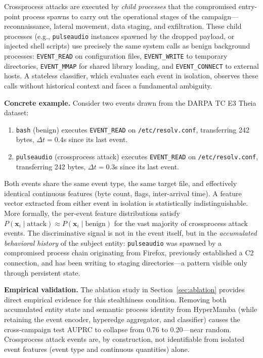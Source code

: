 \documentclass[letterpaper,twocolumn,10pt]{article}
\begin{document}
Crossprocess attacks are executed by \emph{child processes} that the compromised entry-point process spawns to carry out the operational stages of the campaign---reconnaissance, lateral movement, data staging, and exfiltration. These child processes (e.g., \texttt{pulseaudio} instances spawned by the dropped payload, or injected shell scripts) use precisely the same system calls as benign background processes: \texttt{EVENT\_READ} on configuration files, \texttt{EVENT\_WRITE} to temporary directories, \texttt{EVENT\_MMAP} for shared library loading, and \texttt{EVENT\_CONNECT} to external hosts. A stateless classifier, which evaluates each event in isolation, observes these calls without historical context and faces a fundamental ambiguity.

\textbf{Concrete example.} Consider two events drawn from the DARPA TC E3 Theia dataset:
\begin{enumerate}
    \item \texttt{bash} (benign) executes \texttt{EVENT\_READ} on \texttt{/etc/resolv.conf}, transferring 242 bytes, $\Delta t = 0.4$s since its last event.
    \item \texttt{pulseaudio} (crossprocess attack) executes \texttt{EVENT\_READ} on \texttt{/etc/resolv.conf}, transferring 242 bytes, $\Delta t = 0.3$s since its last event.
\end{enumerate}
Both events share the same event type, the same target file, and effectively identical continuous features (byte count, flags, inter-arrival time). A feature vector extracted from either event in isolation is statistically indistinguishable. More formally, the per-event feature distributions satisfy $P(\mathbf{x}_i \mid \text{attack}) \approx P(\mathbf{x}_i \mid \text{benign})$ for the vast majority of crossprocess attack events. The discriminative signal is not in the event itself, but in the \emph{accumulated behavioral history} of the subject entity: \texttt{pulseaudio} was spawned by a compromised process chain originating from Firefox, previously established a C2 connection, and has been writing to staging directories---a pattern visible only through persistent state.

\textbf{Empirical validation.} The ablation study in Section~\ref{sec:ablation} provides direct empirical evidence for this stealthiness condition. Removing both accumulated entity state and semantic process identity from HyperMamba (while retaining the event encoder, hyperedge aggregator, and classifier) causes the cross-campaign test AUPRC to collapse from 0.76 to 0.20---near random. Crossprocess attack events are, by construction, not identifiable from isolated event features (event type and continuous quantities) alone.
\end{document}
